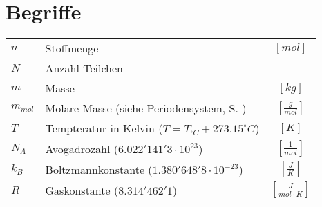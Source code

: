 \section{Begriffe}
\begin{table}[h!]
\renewcommand{\arraystretch}{1.5}
\begin{tabular}{p{} l c}
$n$		
	& Stoffmenge 		
	& $[mol]$ \\
$N$		
	& Anzahl Teilchen 	
	& - \\
$m$		
	& Masse 		
	& $[kg]$ \\
$m_{mol}$	
	& Molare Masse (siehe Periodensystem, S. \pageref{fig:persys})	
	& $\left[\frac{g}{mol}\right]$ \\
$T$		
	& Tempteratur in Kelvin  ($T = T_{^\circ C} + 273.15 ^\circ C$) 
	& $[K]$ \\
$N_A$	
	& Avogadrozahl ($6.022'141'3 \cdot 10^{23}$) 
	& $\left[\frac{1}{mol}\right]$ \\
$k_B$		
	& Boltzmannkonstante ($1.380'648'8 \cdot 10^{-23}$)
	& $\left[\frac{J}{K}\right]$ \\ 
$R$	
	& Gaskonstante ($8.314'462'1$)
	& $\left[\frac{J}{mol \cdot K}\right]$
\end{tabular}
\end{table}
